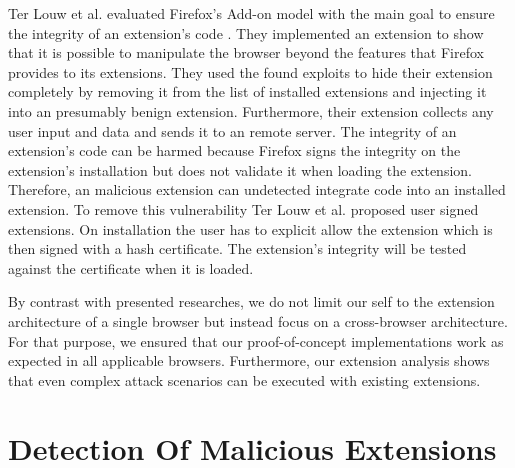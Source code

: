 	Ter Louw et al. evaluated Firefox's Add-on model with the main goal to ensure the integrity of an extension's code \cite{TerLouw:2007:EWB:1420581.1420583}. They implemented an extension to show that it is possible to manipulate the browser beyond the features that Firefox provides to its extensions. They used the found exploits to hide their extension completely by removing it from the list of installed extensions and injecting it into an presumably benign extension. Furthermore, their extension collects any user input and data and sends it to an remote server. The integrity of an extension's code can be harmed because Firefox signs the integrity on the extension's installation but does not validate it when loading the extension. Therefore, an malicious extension can undetected integrate code into an installed extension. To remove this vulnerability Ter Louw et al. proposed user signed extensions. On installation the user has to explicit allow the extension which is then signed with a hash certificate. The extension's integrity will be tested against the certificate when it is loaded. 

	By contrast with presented researches, we do not limit our self to the extension architecture of a single browser but instead focus on a cross-browser architecture. For that purpose, we ensured that our proof-of-concept implementations work as expected in all applicable browsers. Furthermore, our extension analysis shows that even complex attack scenarios can be executed with existing extensions.
	
\section{Detection Of Malicious Extensions}
\label{sec:relatedWorks:detectionOfMaliciousExtensions} 
	
